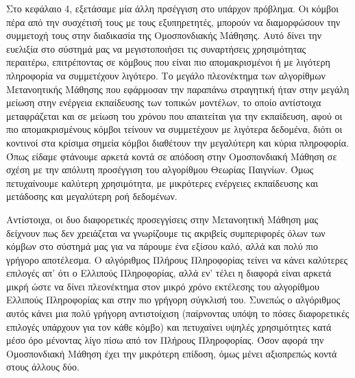 Στο κεφάλαιο 4, εξετάσαμε μία άλλη πρσέγγιση στο υπάρχον πρόβλημα. Οι κόμβοι πέρα από την συσχέτισή τους με τους εξυπηρετητές, μπορούν να διαμορφώσουν την συμμετοχή τους στην διαδικασία της Ομοσπονδιακής Μάθησης. Αυτό δίνει την ευελιξία στο σύστημά μας να μεγιστοποιήσει τις συναρτήσεις χρησιμότητας περαιτέρω, επιτρέποντας σε κόμβους που είναι πιο απομακρισμένοι ή με λιγότερη πληροφορία να συμμετέχουν λιγότερο. Το μεγάλο πλεονέκτημα των αλγορίθμων Μετανοητικής Μάθησης που εφάρμοσαν την παραπάνω στραγητική ήταν στην μεγάλη μείωση στην ενέργεια εκπαίδευσης των τοπικών μοντέλων, το οποίο αντίστοιχα μεταφράζεται και σε μείωση του χρόνου που απαιτείται για την εκπαίδευση, αφού οι πιο απομακρισμένους κόμβοι τείνουν να συμμετέχουν με λιγότερα δεδομένα, διότι οι κοντινοί στα κρίσιμα σημεία κόμβοι διαθέτουν την μεγαλύτερη και κύρια πληροφορία. Όπως είδαμε φτάνουμε αρκετά κοντά σε απόδοση στην Ομοσπονδιακή Μάθηση σε σχέση με την απόλυτη προσέγγιση του αλγορίθμου Θεωρίας Παιγνίων. Όμως πετυχαίνουμε καλύτερη χρησιμότητα, με μικρότερες ενέργειες εκπαίδευσης και μετάδοσης και μεγαλύτερη ροή δεδομένων.

Αντίστοιχα, οι δυο διαφορετικές προσεγγίσεις στην Μετανοητική Μάθηση μας δείχνουν πως δεν χρειάζεται να γνωρίζουμε τις ακριβείς συμπεριφορές όλων των κόμβων στο σύστημά μας για να πάρουμε ένα εξίσου καλό, αλλά και πολύ πιο γρήγορο αποτέλεσμα. Ο αλγόριθμος Πλήρους Πληροφορίας τείνει να κάνει καλύτερες επιλογές απ' ότι ο Ελλιπούς Πληροφορίας, αλλά εν' τέλει η διαφορά είναι αρκετά μικρή ώστε να δίνει πλεονέκτημα στον μικρό χρόνο εκτέλεσης του αλγορίθμου Ελλιπούς Πληροφορίας και στην πιο γρήγορη σύγκλισή του. Συνεπώς ο αλγόριθμος αυτός κάνει μια πολύ γρήγορη αντιστοίχιση (παίρνοντας υπόψη το πόσες διαφορετικές επιλογές υπάρχουν για τον κάθε κόμβο) και πετυχαίνει υψηλές χρησιμότητες κατά μέσο όρο μένοντας λίγο πίσω από τον Πλήρους Πληροφορίας. Όσον αφορά την Ομοσπονδιακή Μάθηση έχει την μικρότερη επίδοση, όμως μένει αξιοπρεπώς κοντά στους άλλους δύο.

